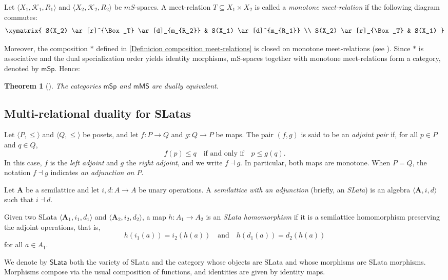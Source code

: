 \documentclass{article}
\newtheorem{theorem}{\bf Theorem}[section]
\begin{document}
Let $\langle X_1, \mathcal{K}_1, R_1 \rangle$ and $\langle X_2, \mathcal{K}_2, R_2 \rangle$ be $mS$-spaces. A meet-relation $T \subseteq X_1 \times X_2$ is called a \emph{monotone meet-relation} if the following diagram commutes:
\[
\xymatrix{
S(X_2) \ar[r]^{\Box_T} \ar[d]_{m_{R_2}} & S(X_1) \ar[d]^{m_{R_1}} \\
S(X_2) \ar[r]_{\Box_T} & S(X_1)
}
\]

Moreover, the composition $\ast$ defined in \eqref{Definicion composition meet-relations} is closed on monotone meet-relations (see \cite{P W}). Since $\ast$ is associative and the dual specialization order yields identity morphisms, mS-spaces together with monotone meet-relations form a category, denoted by $\mathsf{mSp}$. Hence:

\begin{theorem}[\cite{P W}]\label{duality Msp mMS}
    The categories $\mathsf{mSp}$ and $\mathsf{mMS}$ are dually equivalent.
\end{theorem}

\subsection{Multi-relational duality for SLatas}

Let $\langle P,\leq \rangle$ and $\langle Q,\leq\rangle$ be posets, and let $f \colon P \to Q$ and $g \colon Q \to P$ be maps. The pair $(f,g)$ is said to be an \emph{adjoint pair} if, for all $p \in P$ and $q \in Q$,
\[
f(p) \leq q \quad \text{if and only if} \quad p \leq g(q).
\]
In this case, $f$ is the \emph{left adjoint} and $g$ the \emph{right adjoint}, and we write $f \dashv g$. In particular, both maps are monotone. When $P=Q$, the notation $f \dashv g$ indicates \emph{an adjunction on $P$}.

\medskip

Let $\mathbf{A}$ be a semilattice and let $i,d \colon A \to A$ be unary operations. A \emph{semilattice with an adjunction} (briefly, an \emph{SLata}) is an algebra $\langle \mathbf{A}, i, d \rangle$ such that $i \dashv d$.

Given two SLata $\langle \mathbf{A}_1, i_1, d_1\rangle$ and $\langle \mathbf{A}_2, i_2, d_2\rangle$, a map $h \colon A_1 \to A_2$ is an \emph{SLata homomorphism} if it is a semilattice homomorphism preserving the adjoint operations, that is,
\[
h(i_1(a)) = i_2(h(a)) \quad \text{and} \quad h(d_1(a)) = d_2(h(a))
\]
for all $a \in A_1$.

We denote by $\mathsf{SLata}$ both the variety of SLata and the category whose objects are SLata and whose morphisms are SLata morphisms. Morphisms compose via the usual composition of functions, and identities are given by identity maps.
\end{document}
